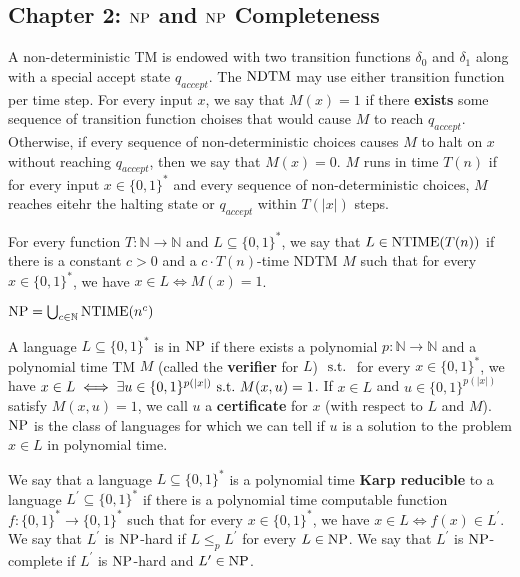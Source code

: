 \subsection*{Chapter 2: $\NP$ and $\NP$ Completeness}
\begin{note}
  A non-deterministic TM is endowed with two transition functions
  $\delta_0$ and $\delta_1$ along with a special accept state $q_{accept}$.
  The $\mathrm{NDTM}$ may use either transition function per time step.
  For every input $x$, we say that $M(x) = 1$ if there \textbf{exists}
  some sequence of transition function choises
  that would cause $M$ to reach $q_{accept}$.
  Otherwise, if every sequence of non-deterministic choices causes $M$ to halt
  on $x$ without reaching $q_{accept}$, then we say that $M(x) = 0$.
  $M$ runs in time $T(n)$ if for every input $x \in \{0, 1\}^\ast$ and every
  sequence of non-deterministic choices, $M$ reaches eitehr the halting state
  or $q_{accept}$ within $T(|x|)$ steps.
\end{note}

\begin{note}[$\NTIME$]
  For every function $T : \mathbb{N} \to \mathbb{N}$ and
  $L \subseteq \{0, 1\}^\ast$, we say that $L \in \mathrm{NTIME}(T(n))$ if there is
  a constant $c > 0$ and a $c \cdot T(n)$-time NDTM $M$ such that for
  every $x \in \{0, 1\}^\ast$, we have $x \in L \iff M(x) = 1$.
\end{note}

\begin{note}[$\NP$]
  $\mathrm{NP} = \bigcup_{c \in \mathbb{N}} \mathrm{NTIME}(n^c)$
\end{note}

\begin{note}[]
  A language $L \subseteq \{0, 1\}^\ast$ is in $\NP$ if there exists a
  polynomial $p : \mathbb{N} \to \mathbb{N}$ and a polynomial time TM $M$
  (called the \textbf{verifier} for $L$) $\mathrm{\ s.t.\ }$ for every
  $x \in \{0, 1\}^\ast$, we have
  $x \in L \iff \exists u \in \{0, 1\}^{p(|x|)} \mathrm{\ s.t.\ } M(x, u) = 1$.
  If $x \in L$ and $u \in \{0, 1\}^{p(|x|)}$ satisfy $M(x, u) = 1$,
  we call $u$ a \textbf{certificate} for $x$ (with respect to $L$ and $M$).
  $\NP$ is the class of languages for which we can tell if
  $u$ is a solution to the problem $x \in L$ in polynomial time.
\end{note}

\begin{note}
  We say that a language $L \subseteq \{0, 1\}^\ast$ is a polynomial time
  \textbf{Karp reducible} to a language $L^\prime \subseteq \{0, 1\}^\ast$ if
  there is a polynomial time computable function
  $f : \{0, 1\}^\ast \to \{0, 1\}^\ast$ such that for
  every $x \in \{0, 1\}^\ast$, we have $x \in L \iff f(x) \in L^\prime$.
  We say that $L^\prime$ is $\NP$-hard if $L \leq_p L^\prime$ for every
  $L \in \mathrm{NP}$.
  We say that $L^\prime$ is $\NP$-complete if $L^\prime$ is $\NP$-hard and
  $L^\prime \in \mathrm{NP}$.
\end{note}

